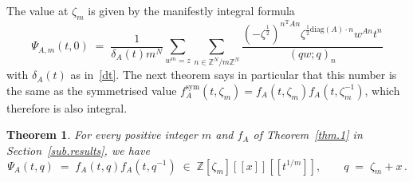 \documentclass[12pt,reqno]{amsart}
\newcounter{theoremcount}
\newtheorem{theorem}[theoremcount]{Theorem}
\theoremstyle{definition}
\def\BZ{\mathbb Z}
\def\be{\begin{equation}}
\def\ee{\end{equation}}
\def\z{\zeta}
\def\diag{\mathrm{diag}}
\def\={\;=\;}
\def\inn{\;\in\;}
\def\Tran{\mathrm{T}}
\def\Phitof{f}
\begin{document}
The value at $\z_m$ is given by the manifestly integral formula
\be
\Psi_{A,m}(t,0)
\=
\frac{1}{\delta_A(t) m^N}
\sum_{w^m=z}
\sum_{n\in\BZ^{N}/m\BZ^{N}}
\frac{(-\z^{\frac{1}{2}})^{n^{\Tran}An}\z^{\frac{1}{2}\diag(A)\cdot n}w^{An}
t^n}{(qw;q)_n} 
\ee
with $\delta_A(t)$ as in~\eqref{dt}. 
The next theorem says in particular that this number is the same as the symmetrised
value $\Phitof_A^{\mathrm{sym}}(t,\z_m)=\Phitof_A(t,\z_m)\Phitof_A(t,\z_m^{-1})$, which
therefore is also integral.

\begin{theorem}
\label{thm.sym}
For every positive integer $m$ and $\Phitof_A$ of Theorem~\ref{thm.1} in
Section~\ref{sub.results}, we have
\be
\label{phipsi}
\Psi_A(t,q) \= \Phitof_A(t,q) \Phitof_A(t,q^{-1}) \inn
\BZ[\z_m][\![x]\!][\![t^{1/m}]\!], \qquad q\=\z_m+x \,.
\ee
\end{theorem}
\end{document}
